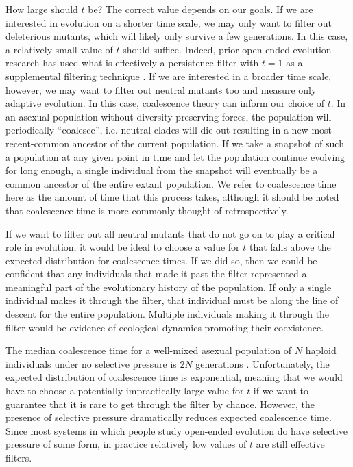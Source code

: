 \documentclass[letterpaper]{article}
\begin{document}
How large should $t$ be? The correct value depends on our goals. If we are interested in evolution on a shorter time scale, we may only want to filter out deleterious mutants, which will likely only survive a few generations. In this case, a relatively small value of $t$ should suffice. Indeed, prior open-ended evolution research has used what is effectively a persistence filter with $t = 1$ as a supplemental filtering technique \citep{channon_improving_2003}. If we are interested in a broader time scale, however, we may want to filter out neutral mutants too and measure only adaptive evolution. In this case, coalescence theory can inform our choice of $t$. In an asexual population without diversity-preserving forces, the population will periodically ``coalesce'', i.e. neutral clades will die out resulting in a new most-recent-common ancestor of the current population. If we take a snapshot of such a population at any given point in time and let the population continue evolving for long enough,  a single individual from the snapshot will eventually be a common ancestor of the entire extant population. We refer to coalescence time here as the amount of time that this process takes, although it should be noted that coalescence time is more commonly thought of retrospectively. 

If we want to filter out all neutral mutants that do not go on to play a critical role in evolution, it would be ideal to choose a value for $t$ that falls above the expected distribution for coalescence times. If we did so, then we could be confident that any individuals that made it past the filter represented a meaningful part of the evolutionary history of the population. If only a single individual makes it through the filter, that individual must be along the line of descent for the entire population. Multiple individuals making it through the filter would be evidence of ecological dynamics promoting their coexistence.
    
The median coalescence time for a well-mixed asexual population of $N$ haploid individuals under no selective pressure is $2N$ generations \citep{fu_coalescing_1999}.  Unfortunately, the expected distribution of coalescence time is exponential, meaning that we would have to choose a potentially impractically large value for $t$ if we want to guarantee that it is rare to get through the filter by chance. However, the presence of selective pressure dramatically reduces expected coalescence time. Since most systems in which people study open-ended evolution do have selective pressure of some form, in practice relatively low values of $t$ are still effective filters.
\end{document}
